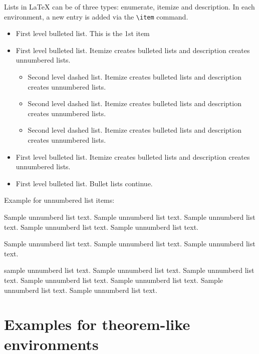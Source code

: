 \documentclass[unnumsec,webpdf,modern,large]{mam-authoring-template}%
\theoremstyle{thmstyleone}%
\theoremstyle{thmstyletwo}%
\theoremstyle{thmstylethree}%
\begin{document}
Lists in \LaTeX{} can be of three types: enumerate, itemize and description.
In each environment, a new entry is added via the \verb+\item+ command.
\begin{itemize}
\item First level bulleted list. This is the 1st item

\item First level bulleted list. Itemize creates bulleted lists and description creates unnumbered lists.
\begin{itemize}
\item Second level dashed list. Itemize creates bulleted lists and description creates unnumbered lists.

\item Second level dashed list. Itemize creates bulleted lists and description creates unnumbered lists.

\item Second level dashed list. Itemize creates bulleted lists and description creates unnumbered lists.
\end{itemize}

\item First level bulleted list. Itemize creates bulleted lists and description creates unnumbered lists.

\item First level bulleted list. Bullet lists continue.
\end{itemize}

\noindent
Example for unnumbered list items:

\begin{unlist}
\item Sample unnumberd list text. Sample unnumberd list text. Sample unnumberd list text. Sample unnumberd list text. Sample unnumberd list text.

\item Sample unnumberd list text. Sample unnumberd list text. Sample unnumberd list text.

\item sample unnumberd list text. Sample unnumberd list text. Sample unnumberd list text. Sample unnumberd list text. Sample unnumberd list text. Sample unnumberd list text. Sample unnumberd list text.
\end{unlist}

\section{Examples for theorem-like environments}\label{sec10}
\end{document}
